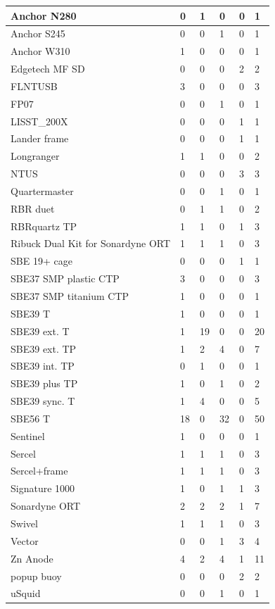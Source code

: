 \documentclass{article}
\begin{document}
\begin{tabularx}{\linewidth}{|l|l|l|l|l|l|}
Anchor N280 & 0 & 1 & 0 & 0 & 1 \\ \hline
Anchor S245 & 0 & 0 & 1 & 0 & 1 \\ \hline
Anchor W310 & 1 & 0 & 0 & 0 & 1 \\ \hline
Edgetech MF SD & 0 & 0 & 0 & 2 & 2 \\ \hline
FLNTUSB & 3 & 0 & 0 & 0 & 3 \\ \hline
FP07 & 0 & 0 & 1 & 0 & 1 \\ \hline
LISST\_200X & 0 & 0 & 0 & 1 & 1 \\ \hline
Lander frame & 0 & 0 & 0 & 1 & 1 \\ \hline
Longranger & 1 & 1 & 0 & 0 & 2 \\ \hline
NTUS & 0 & 0 & 0 & 3 & 3 \\ \hline
Quartermaster & 0 & 0 & 1 & 0 & 1 \\ \hline
RBR duet & 0 & 1 & 1 & 0 & 2 \\ \hline
RBRquartz TP & 1 & 1 & 0 & 1 & 3 \\ \hline
Ribuck Dual Kit for Sonardyne ORT & 1 & 1 & 1 & 0 & 3 \\ \hline
SBE 19+ cage & 0 & 0 & 0 & 1 & 1 \\ \hline
SBE37 SMP plastic CTP & 3 & 0 & 0 & 0 & 3 \\ \hline
SBE37 SMP titanium CTP & 1 & 0 & 0 & 0 & 1 \\ \hline
SBE39 T & 1 & 0 & 0 & 0 & 1 \\ \hline
SBE39 ext. T & 1 & 19 & 0 & 0 & 20 \\ \hline
SBE39 ext. TP & 1 & 2 & 4 & 0 & 7 \\ \hline
SBE39 int. TP & 0 & 1 & 0 & 0 & 1 \\ \hline
SBE39 plus TP & 1 & 0 & 1 & 0 & 2 \\ \hline
SBE39 sync. T & 1 & 4 & 0 & 0 & 5 \\ \hline
SBE56 T & 18 & 0 & 32 & 0 & 50 \\ \hline
Sentinel & 1 & 0 & 0 & 0 & 1 \\ \hline
Sercel & 1 & 1 & 1 & 0 & 3 \\ \hline
Sercel+frame & 1 & 1 & 1 & 0 & 3 \\ \hline
Signature 1000 & 1 & 0 & 1 & 1 & 3 \\ \hline
Sonardyne ORT & 2 & 2 & 2 & 1 & 7 \\ \hline
Swivel & 1 & 1 & 1 & 0 & 3 \\ \hline
Vector & 0 & 0 & 1 & 3 & 4 \\ \hline
Zn Anode & 4 & 2 & 4 & 1 & 11 \\ \hline
popup buoy & 0 & 0 & 0 & 2 & 2 \\ \hline
uSquid & 0 & 0 & 1 & 0 & 1 \\ \hline
\end{tabularx}
\end{document}
